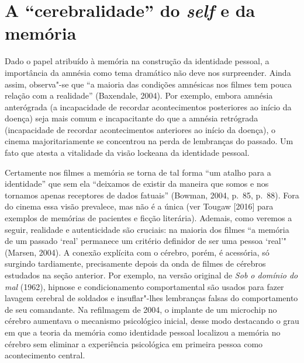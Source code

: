 \section{A ``cerebralidade'' do \emph{self} e da memória}

Dado o papel atribuído à memória na construção da identidade pessoal, a
importância da amnésia como tema dramático não deve nos surpreender.
Ainda assim, observa"-se que ``a maioria das condições amnésicas nos
filmes tem pouca relação com a realidade'' (Baxendale, 2004). Por
exemplo, embora amnésia anterógrada (a incapacidade de recordar
acontecimentos posteriores ao início da doença) seja mais comum e
incapacitante do que a amnésia retrógrada (incapacidade de recordar
acontecimentos anteriores ao início da doença), o cinema
majoritariamente se concentrou na perda de lembranças do passado. Um
fato que atesta a vitalidade da visão lockeana da identidade pessoal.

Certamente nos filmes a memória se torna de tal forma ``um atalho para a
identidade'' que sem ela ``deixamos de existir da maneira que somos e
nos tornamos apenas receptores de dados fatuais'' (Bowman, 2004, p.~85,
p.~88). Fora do cinema essa visão prevalece, mas não é a única (ver Tougaw
{[}2016{]} para exemplos de memórias de pacientes e ficção literária).
Ademais, como veremos a seguir, realidade e autenticidade são cruciais:
na maioria dos filmes ``a memória de um passado `real' permanece um
critério definidor de ser uma pessoa `real'" (Marsen, 2004). A conexão
explícita com o cérebro, porém, é acessória, só surgindo tardiamente,
precisamente depois da onda de filmes de cérebros estudados na seção
anterior. Por exemplo, na versão original de \emph{Sob o domínio do mal}
(1962), hipnose e condicionamento comportamental são usados para fazer
lavagem cerebral de soldados e insuflar"-lhes lembranças falsas do
comportamento de seu comandante. Na refilmagem de 2004, o implante de um
microchip no cérebro aumentava o mecanismo psicológico inicial, desse
modo destacando o grau em que a teoria da memória como identidade
pessoal localizou a memória no cérebro sem eliminar a experiência
psicológica em primeira pessoa como acontecimento central.

